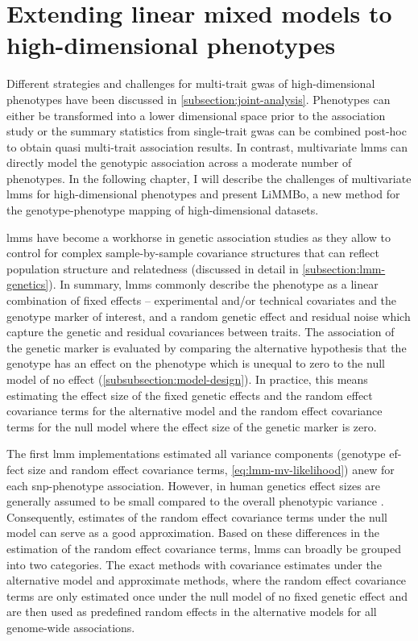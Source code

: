 \chapter{Extending linear mixed models to high-dimensional phenotypes}
\label{chapter:limmbo}
Different strategies and challenges for multi-trait \gls{gwas} of high-dimensional phenotypes have been discussed in \cref{subsection:joint-analysis}. Phenotypes can either be transformed into a lower dimensional space prior to the association study or the summary statistics from single-trait \gls{gwas} can be combined post-hoc to obtain quasi multi-trait association results. In contrast, multivariate \glspl{lmm} can directly model the genotypic association across a moderate number of phenotypes. In the following chapter, I will describe the challenges of multivariate \glspl{lmm} for high-dimensional phenotypes and present LiMMBo, a new method for the genotype-phenotype mapping of high-dimensional datasets. 

\glspl{lmm} have become a workhorse in genetic association studies as they allow to control for complex sample-by-sample covariance structures that can reflect population structure and relatedness (discussed in detail in \cref{subsection:lmm-genetics}). In summary, \glspl{lmm} commonly describe the phenotype as a linear combination of fixed effects -- experimental and/or technical  covariates and the genotype marker of interest, and a random genetic effect and residual noise which capture the genetic and residual covariances between traits. The association of the genetic marker is evaluated by comparing the alternative hypothesis that the genotype has an effect on the phenotype which is unequal to zero to the null model of no effect (\cref{subsubsection:model-design}). In practice, this means estimating the effect size of the fixed genetic effects and the random effect covariance terms for the alternative model and the random effect covariance terms for the null model where the effect size of the genetic marker is zero. 

The first \gls{lmm} implementations estimated all variance components (genotype ef- fect size and random effect covariance terms, \cref{eq:lmm-mv-likelihood}) anew for each \gls{snp}-phe\-notype association. However, in human genetics effect sizes are generally assumed to be small compared to the overall phenotypic variance \citep{Kang2010,Zhang2010}. Consequently, estimates of the random effect covariance terms under the null model can serve as a good approximation. Based on these differences in the estimation of the random effect covariance terms, \glspl{lmm} can broadly be grouped into two categories. The exact methods with covariance estimates under the alternative model and approximate methods, where the random effect covariance terms are only estimated once under the null model of no fixed genetic effect and are then used as predefined random effects in the alternative models for all genome-wide associations. 

